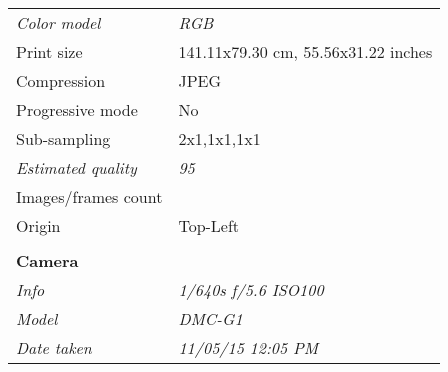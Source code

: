 \begin{tabular}{m{33.58mm}m{138.32mm}}
{\fontsize{9pt}{10.8pt}\selectfont\itshape Color model} &
{\fontsize{9pt}{10.8pt}\selectfont\itshape RGB}\\
{\fontsize{9pt}{10.8pt}\selectfont Print size} &
{\fontsize{9pt}{10.8pt}\selectfont 141.11x79.30 cm, 55.56x31.22 inches}\\
{\fontsize{9pt}{10.8pt}\selectfont Compression} &
{\fontsize{9pt}{10.8pt}\selectfont JPEG}\\
{\fontsize{9pt}{10.8pt}\selectfont Progressive mode} &
{\fontsize{9pt}{10.8pt}\selectfont No}\\
{\fontsize{9pt}{10.8pt}\selectfont Sub-sampling} &
{\fontsize{9pt}{10.8pt}\selectfont 2x1,1x1,1x1}\\
{\fontsize{9pt}{10.8pt}\selectfont\itshape Estimated quality} &
{\fontsize{9pt}{10.8pt}\selectfont\itshape 95}\\
{\fontsize{9pt}{10.8pt}\selectfont Images/frames count} &
{\fontsize{9pt}{10.8pt}\selectfont 1}\\
{\fontsize{9pt}{10.8pt}\selectfont Origin} &
{\fontsize{9pt}{10.8pt}\selectfont Top-Left}\\ & \\
{\fontsize{9pt}{10.8pt}\selectfont\bfseries Camera} & \\
{\fontsize{9pt}{10.8pt}\selectfont\itshape Info} &
{\fontsize{9pt}{10.8pt}\selectfont\itshape 1/640s f/5.6 ISO100 }\\
{\fontsize{9pt}{10.8pt}\selectfont\itshape Model} &
{\fontsize{9pt}{10.8pt}\selectfont\itshape DMC-G1}\\
{\fontsize{9pt}{10.8pt}\selectfont\itshape Date taken} &
{\fontsize{9pt}{10.8pt}\selectfont\itshape 11/05/15 12:05 PM}\\

\end{tabular}




